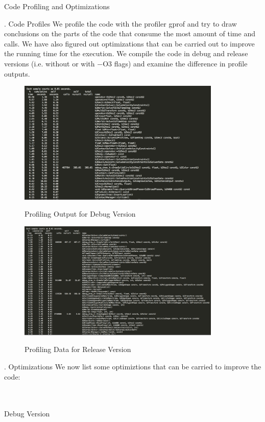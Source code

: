 \documentclass[a4paper,11pt]{resume}
\begin{document}
\begin{rSection}{{\heading Code Profiling and Optimizations}}
\begin{rSubsection}{{. Code Profiles}}{}{}{}
We profile the code with the profiler gprof and try to draw conclusions on the parts of the code that consume the most amount of time and calls. We have also figured out optimizations that can be carried out to improve the running time for the execution. We compile the code in debug and release versions (i.e. without or with −O3 flags) and examine the difference in profile outputs.
\begin{figure}[h]
\centering
\includegraphics[width=0.86\textwidth]{debug}
\label{fig:init}
\caption{Profiling Output for Debug Version}
\end{figure}
\begin{figure}[h]
\centering
\includegraphics[width=0.86\textwidth]{release}
\label{fig:init}
\caption{Profiling Data for Release Version}
\end{figure}
\end{rSubsection}
\newpage
\begin{rSubsection}{{. Optimizations}}{}{}{}
We now list some optimiztions that can be carried to improve the code:
\\ \\ \\
\begin{rSubsection}{{ Debug Version}}{}{}{}

\end{rSubsection}
\end{rSubsection}
\end{rSection}
\end{document}
